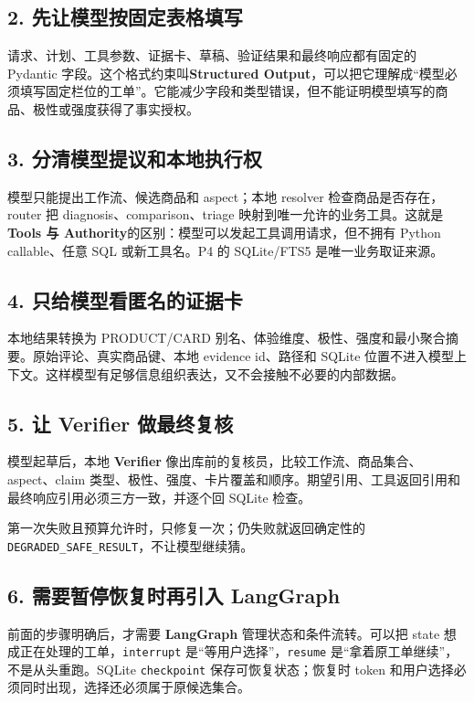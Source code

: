 \subsection{2. 先让模型按固定表格填写}

请求、计划、工具参数、证据卡、草稿、验证结果和最终响应都有固定的 Pydantic 字段。这个格式约束叫\textbf{Structured Output}，可以把它理解成“模型必须填写固定栏位的工单”。它能减少字段和类型错误，但不能证明模型填写的商品、极性或强度获得了事实授权。

\subsection{3. 分清模型提议和本地执行权}

模型只能提出工作流、候选商品和 aspect；本地 resolver 检查商品是否存在，router 把 diagnosis、comparison、triage 映射到唯一允许的业务工具。这就是\textbf{Tools 与 Authority}的区别：模型可以发起工具调用请求，但不拥有 Python callable、任意 SQL 或新工具名。P4 的 SQLite/FTS5 是唯一业务取证来源。

\subsection{4. 只给模型看匿名的证据卡}

本地结果转换为 PRODUCT/CARD 别名、体验维度、极性、强度和最小聚合摘要。原始评论、真实商品键、本地 evidence id、路径和 SQLite 位置不进入模型上下文。这样模型有足够信息组织表达，又不会接触不必要的内部数据。

\subsection{5. 让 Verifier 做最终复核}

模型起草后，本地 \textbf{Verifier} 像出库前的复核员，比较工作流、商品集合、aspect、claim 类型、极性、强度、卡片覆盖和顺序。期望引用、工具返回引用和最终响应引用必须三方一致，并逐个回 SQLite 检查。

第一次失败且预算允许时，只修复一次；仍失败就返回确定性的 \texttt{DEGRADED\_SAFE\_RESULT}，不让模型继续猜。

\subsection{6. 需要暂停恢复时再引入 LangGraph}

前面的步骤明确后，才需要 \textbf{LangGraph} 管理状态和条件流转。可以把 state 想成正在处理的工单，\texttt{interrupt} 是“等用户选择”，\texttt{resume} 是“拿着原工单继续”，不是从头重跑。SQLite \texttt{checkpoint} 保存可恢复状态；恢复时 token 和用户选择必须同时出现，选择还必须属于原候选集合。

